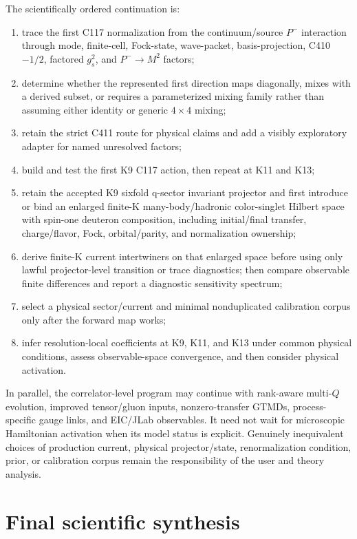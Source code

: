 \documentclass[11pt,oneside]{book}
\begin{document}
The scientifically ordered continuation is:
\begin{enumerate}[label=\textbf{Step \arabic*:}]
 \item trace the first C117 normalization from the continuum/source $P^-$ interaction through mode, finite-cell, Fock-state, wave-packet, basis-projection, C410 $-1/2$, factored $g_s^2$, and $P^-\to M^2$ factors;
 \item determine whether the represented first direction maps diagonally, mixes with a derived subset, or requires a parameterized mixing family rather than assuming either identity or generic $4\times4$ mixing;
 \item retain the strict C411 route for physical claims and add a visibly exploratory adapter for named unresolved factors;
 \item build and test the first K9 C117 action, then repeat at K11 and K13;
 \item retain the accepted K9 sixfold q-sector invariant projector and first introduce or bind an enlarged finite-K many-body/hadronic color-singlet Hilbert space with spin-one deuteron composition, including initial/final transfer, charge/flavor, Fock, orbital/parity, and normalization ownership;
 \item derive finite-K current intertwiners on that enlarged space before using only lawful projector-level transition or trace diagnostics; then compare observable finite differences and report a diagnostic sensitivity spectrum;
 \item select a physical sector/current and minimal nonduplicated calibration corpus only after the forward map works;
 \item infer resolution-local coefficients at K9, K11, and K13 under common physical conditions, assess observable-space convergence, and then consider physical activation.
\end{enumerate}
In parallel, the correlator-level program may continue with rank-aware multi-$Q$ evolution, improved tensor/gluon inputs, nonzero-transfer GTMDs, process-specific gauge links, and EIC/JLab observables.  It need not wait for microscopic Hamiltonian activation when its model status is explicit.  Genuinely inequivalent choices of production current, physical projector/state, renormalization condition, prior, or calibration corpus remain the responsibility of the user and theory analysis.

\section{Final scientific synthesis}
\end{document}
